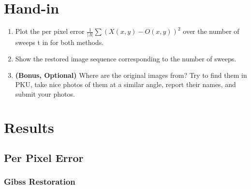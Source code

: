 \documentclass[11pt]{article}
\begin{document}
\section{Hand-in}

\begin{enumerate}
    \item Plot the per pixel error $\frac{1}{|\Lambda|} \sum (X(x,y) -  O(x,y)) ^ 2$ over the number of sweeps t in for both methods. 
    \item Show the restored image sequence corresponding to the number of sweeps.
    \item \textbf{(Bonus, Optional)} Where are the original images from? Try to find them in PKU, take nice photos of them at a similar angle, report their names, and submit your photos. 
\end{enumerate}

\section{Results}

\subsection{Per Pixel Error}

\subsubsection{Gibss Restoration}
\end{document}
